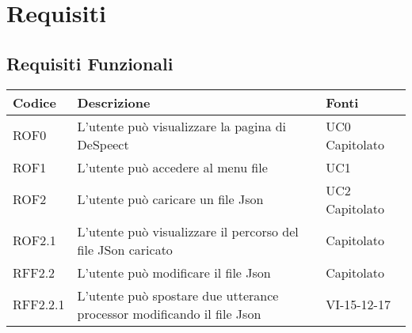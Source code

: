 \documentclass[../AnalisideiRequisiti.tex]{subfiles}
\begin{document}
	\chapter{Requisiti}
	\section{Requisiti Funzionali}
	\begin{longtable}{| p{3cm} | p{6cm} | p{3cm} |}
		\hline
		\textbf{Codice} & \textbf{Descrizione} & \textbf{Fonti}\\
		\hline
		\endhead
		\newline ROF0&
		\newline L'utente può visualizzare la pagina di DeSpeect&
		\newline UC0 \newline Capitolato
		\\[1em]
		\hline
		\newline ROF1&
		\newline L'utente può accedere al menu file&
		\newline UC1
		\\[1em]	
		
		\hline
			
		
		\newline ROF2&
		\newline L'utente può caricare un file Json&
		\newline UC2 \newline Capitolato
		\\[1em]	
			\hline	
			
		\newline ROF2.1&
		\newline L'utente può visualizzare il percorso del file JSon caricato&
		\newline Capitolato
		\\[1em]	
		\hline	
		
		\newline RFF2.2&
		\newline L'utente può modificare il file Json&
		\newline Capitolato
		\\[1em]	
		\hline
				
		\newline RFF2.2.1&
		\newline L'utente può spostare due utterance processor modificando il file Json&
		\newline VI-15-12-17
		\\[1em]	
		\hline
		

\end{longtable}
\end{document}

